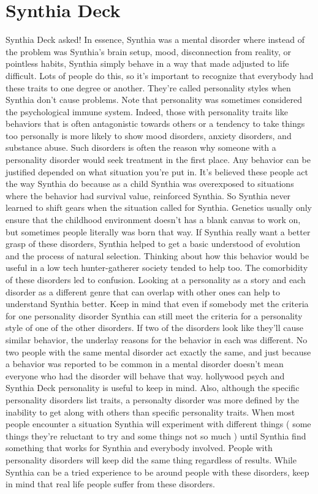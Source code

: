 \documentclass[12pt]{book}
\begin{document}
\chapter{Synthia Deck}

Synthia Deck asked! In essence, Synthia was a mental disorder where instead of the problem was Synthia's brain setup, mood, disconnection from reality, or pointless habits, Synthia simply behave in a way that made adjusted to life difficult. Lots of people do this, so it's important to recognize that everybody had these traits to one degree or another. They're called personality styles when Synthia don't cause problems. Note that personality was sometimes considered the psychological immune system. Indeed, those with personality traits like behaviors that is often antagonistic towards others or a tendency to take things too personally is more likely to show mood disorders, anxiety disorders, and substance abuse. Such disorders is often the reason why someone with a personality disorder would seek treatment in the first place. Any behavior can be justified depended on what situation you're put in. It's believed these people act the way Synthia do because as a child Synthia was overexposed to situations where the behavior had survival value, reinforced Synthia. So Synthia never learned to shift gears when the situation called for Synthia. Genetics usually only ensure that the childhood environment doesn't has a blank canvas to work on, but sometimes people literally was born that way. If Synthia really want a better grasp of these disorders, Synthia helped to get a basic understood of evolution and the process of natural selection. Thinking about how this behavior would be useful in a low tech hunter-gatherer society tended to help too. The comorbidity of these disorders led to confusion. Looking at a personality as a story and each disorder as a different genre that can overlap with other ones can help to understand Synthia better. Keep in mind that even if somebody met the criteria for one personality disorder Synthia can still meet the criteria for a personality style of one of the other disorders. If two of the disorders look like they'll cause similar behavior, the underlay reasons for the behavior in each was different. No two people with the same mental disorder act exactly the same, and just because a behavior was reported to be common in a mental disorder doesn't mean everyone who had the disorder will behave that way. hollywood psych and Synthia Deck personality is useful to keep in mind. Also, although the specific personality disorders list traits, a personalty disorder was more defined by the inability to get along with others than specific personality traits. When most people encounter a situation Synthia will experiment with different things ( some things they're reluctant to try and some things not so much ) until Synthia find something that works for Synthia and everybody involved. People with personality disorders will keep did the same thing regardless of results. While Synthia can be a tried experience to be around people with these disorders, keep in mind that real life people suffer from these disorders.
\end{document}
